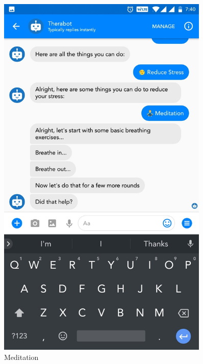 \vspace*{\fill}
\begin{figure}[H]
    \centering
    \begin{minipage}{0.45\textwidth}
        \centering
        \includegraphics[width=0.9\textwidth]{images/screenshots/chatbot/5.jpg}
        \caption{Meditation}
    \end{minipage}\hfill
    \begin{minipage}{0.45\textwidth}
        \centering

\end{minipage}
\end{figure}
